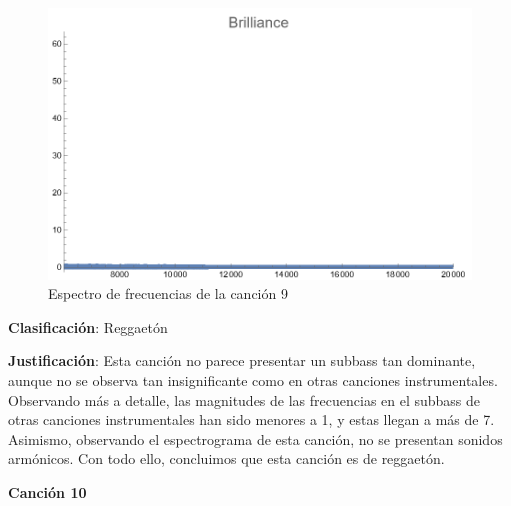\documentclass[12pt, letterpaper]{article}
\begin{document}
\begin{figure}[H]
\begin{minipage}{.3\textwidth}
  \end{minipage}
  \begin{minipage}{0.03\textwidth}\end{minipage}
  \begin{minipage}{.3\textwidth}
    \centering
    \includegraphics[width=.9\linewidth]{imgs/Cancion9/brilliance.png}
  \end{minipage}
  \caption{Espectro de frecuencias de la canción 9}
  \label{fig:esp09}
\end{figure}

\textbf{Clasificación}: Reggaetón

\textbf{Justificación}: Esta canción no parece presentar un subbass tan dominante,
aunque no se observa tan insignificante como en otras canciones instrumentales.
Observando más a detalle, las magnitudes de las frecuencias en el subbass de
otras canciones instrumentales han sido menores a 1, y estas llegan a más de 7.
Asimismo, observando el espectrograma de esta canción, no se presentan sonidos
armónicos. Con todo ello, concluimos que esta canción es de reggaetón.

\newpage

\textbf{\large{Canción 10}}
\end{document}
